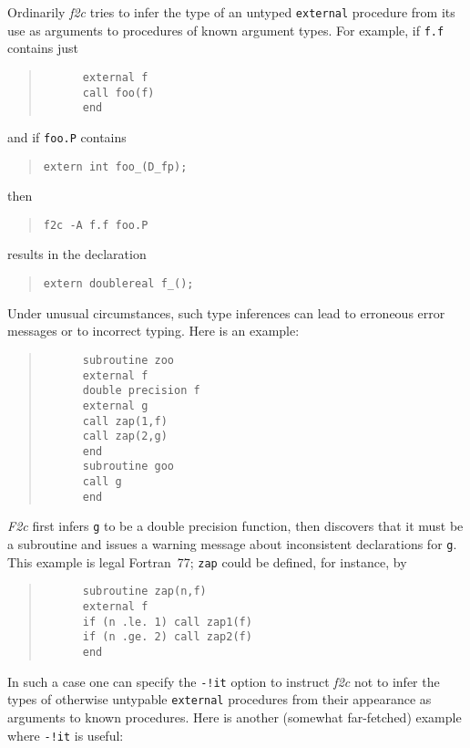 \documentclass[12pt]{article}
\begin{document}
Ordinarily \emph{f2c} tries to infer the type of an untyped \verb|external| procedure from its use as arguments to procedures of known argument types. For example, if \verb|f.f| contains just
\begin{quote}
\begin{verbatim}
      external f
      call foo(f)
      end
\end{verbatim}
\end{quote}
and if \verb|foo.P| contains
\begin{quote}
\begin{verbatim}
extern int foo_(D_fp);
\end{verbatim}
\end{quote}
then
\begin{quote}
\begin{verbatim}
f2c -A f.f foo.P
\end{verbatim}
\end{quote}
results in the declaration
\begin{quote}
\begin{verbatim}
extern doublereal f_();
\end{verbatim}
\end{quote}
Under unusual circumstances, such type inferences can lead to erroneous error messages or to incorrect typing. Here is an example:
\begin{quote}
\begin{verbatim}
      subroutine zoo
      external f
      double precision f
      external g
      call zap(1,f)
      call zap(2,g)
      end
      subroutine goo
      call g
      end
\end{verbatim}
\end{quote}
\emph{F2c} first infers \verb|g| to be a double precision function, then discovers that it must be a subroutine and issues a warning message about inconsistent declarations for \verb|g|. This example is legal Fortran~77; \verb|zap| could be defined, for instance, by
\begin{quote}
\begin{verbatim}
      subroutine zap(n,f)
      external f
      if (n .le. 1) call zap1(f)
      if (n .ge. 2) call zap2(f)
      end
\end{verbatim}
\end{quote}
In such a case one can specify the \verb|-!it| option to instruct \emph{f2c} not to infer the types of otherwise untypable \verb|external| procedures from their appearance as arguments to known procedures. Here is another (somewhat far-fetched) example where \verb|-!it| is useful:
\end{document}
